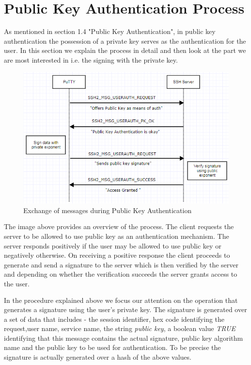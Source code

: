 \documentclass{report}
\begin{document}
\section{Public Key Authentication Process}
As mentioned in section 1.4 "Public Key Authentication", in public key authentication the possession of a private key serves as the authentication for the user. In this section we explain the process in detail and then look at the part we are most interested in i.e. the signing with the private key.\par
\clearpage
\begin{figure}[ht]
\caption{Exchange of messages during Public Key Authentication}
\centering
\includegraphics[width=1\textwidth]{SSH_PK_Auth.png}
\end{figure}
The image above provides an overview of the process. The client requests the server to be allowed to use public key as an authentication mechanism. The server responds positively if the user may be allowed to use public key or negatively otherwise. On receiving a positive response the client proceeds to generate and send a signature to the server which is then verified by the server and depending on whether the verification succeeds the server grants access to the user.\par
In the procedure explained above we focus our attention on the operation that generates a signature using the user's private key. The signature is generated over a set of data that includes - the session identifier, hex code identifying the request,user name, service name, the string \textit{public key}, a boolean value \textit{TRUE} identifying that this message contains the actual signature, public key algorithm name and the public key to be used for authentication. To be precise the signature is actually generated over a hash of the above values.
\end{document}
